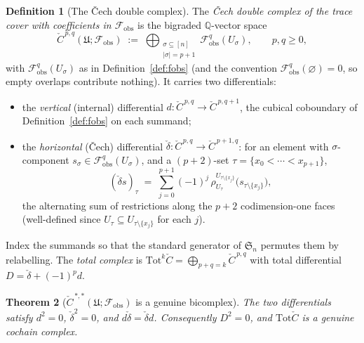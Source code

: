 \documentclass[11pt,oneside]{amsart}
\theoremstyle{plain}
\newtheorem{theorem}{Theorem}[section]
\theoremstyle{definition}
\newtheorem{definition}[theorem]{Definition}
\theoremstyle{remark}
\theoremstyle{honeststyle}
\newcommand{\Sym}{\mathfrak{S}}
\newcommand{\Q}{\mathbb{Q}}
\newcommand{\Tot}{\mathrm{Tot}}
\newcommand{\fobs}{\mathcal{F}_{\mathrm{obs}}}
\newcommand{\Uf}{\mathfrak{U}}
\newcommand{\Ccheck}{\check{C}}
\begin{document}
\begin{definition}[The \v{C}ech double complex]
\label{def:bicomplex}
The \emph{\v{C}ech double complex of the trace cover with coefficients
in $\fobs$} is the bigraded $\Q$-vector space
\[
  \Ccheck^{\,p,q}(\Uf;\fobs)\;:=\;
  \bigoplus_{\substack{\sigma\subseteq[n]\\|\sigma|=p+1}}\fobs^{q}(U_{\sigma}),
  \qquad p,q\ge0,
\]
with $\fobs^{q}(U_{\sigma})$ as in Definition~\ref{def:fobs} (and the
convention $\fobs^{q}(\varnothing)=0$, so empty overlaps contribute
nothing). It carries two differentials:
\begin{itemize}[leftmargin=1.6em]
\item the \emph{vertical} (internal) differential $d\colon
  \Ccheck^{\,p,q}\to\Ccheck^{\,p,q+1}$, the cubical coboundary of
  Definition~\ref{def:fobs} on each summand;
\item the \emph{horizontal} (\v{C}ech) differential $\check\delta\colon
  \Ccheck^{\,p,q}\to\Ccheck^{\,p+1,q}$: for an element with
  $\sigma$-component $s_{\sigma}\in\fobs^{q}(U_{\sigma})$, and a
  $(p+2)$-set $\tau=\{x_{0}<\cdots<x_{p+1}\}$,
  \[
    (\check\delta s)_{\tau}\;=\;\sum_{j=0}^{p+1}(-1)^{j}\,
    \rho^{U_{\tau\setminus\{x_{j}\}}}_{U_{\tau}}
       \bigl(s_{\tau\setminus\{x_{j}\}}\bigr),
  \]
  the alternating sum of restrictions along the $p+2$ codimension-one
  faces (well-defined since $U_{\tau}\subseteq U_{\tau\setminus
  \{x_{j}\}}$ for each $j$).
\end{itemize}
Index the summands so that the standard generator of $\Sym_{n}$
permutes them by relabelling. The \emph{total complex} is
$\Tot^{k}\Ccheck=\bigoplus_{p+q=k}\Ccheck^{\,p,q}$ with total
differential $D=\check\delta+(-1)^{p}d$.
\end{definition}

\begin{theorem}[$\Ccheck^{\,*,*}(\Uf;\fobs)$ is a genuine bicomplex]
\label{thm:bicomplex}
The two differentials satisfy $d^{2}=0$, $\check\delta^{2}=0$, and
$d\check\delta=\check\delta d$. Consequently $D^{2}=0$, and
$\Tot\Ccheck$ is a genuine cochain complex.
\end{theorem}
\end{document}
